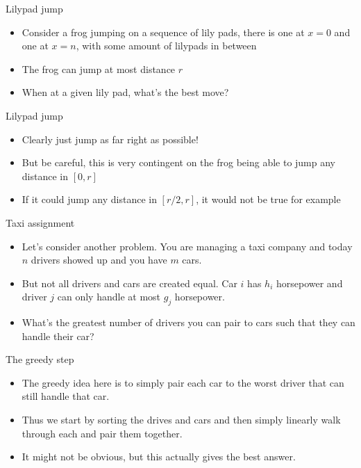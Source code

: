 \documentclass{beamer}
\begin{document}
\begin{frame}[plain]{Lilypad jump}
    \begin{itemize}
        \item Consider a frog jumping on a sequence of lily pads, there is one at $x = 0$ and one at $x = n$, with some amount of lilypads in between
        \item The frog can jump at most distance $r$
        \item When at a given lily pad, what's the best move?
    \end{itemize}
\end{frame}

\begin{frame}[plain]{Lilypad jump}
    \begin{itemize}
        \item Clearly just jump as far right as possible!
        \item But be careful, this is very contingent on the frog being able to jump any distance in $[0, r]$
        \item If it could jump any distance in $[r/2, r]$, it would not be true for example
    \end{itemize}
\end{frame}

\begin{frame}[plain]{Taxi assignment}
    \begin{itemize}
        \item Let's consider another problem. You are managing a taxi company and today $n$ drivers showed up and you have $m$ cars. 
        \item But not all drivers and cars are created equal. Car $i$ has $h_i$ horsepower and driver $j$ can only handle at most $g_j$ horsepower.
        \item What's the greatest number of drivers you can pair to cars such that they can handle their car?
    \end{itemize}
\end{frame}

\begin{frame}[plain]{The greedy step}
    \begin{itemize}
        \item The greedy idea here is to simply pair each car to the worst driver that can still handle that car.
        \item Thus we start by sorting the drives and cars and then simply linearly walk through each and pair them together.
        \item It might not be obvious, but this actually gives the best answer.
    \end{itemize}
\end{frame}
\end{document}
